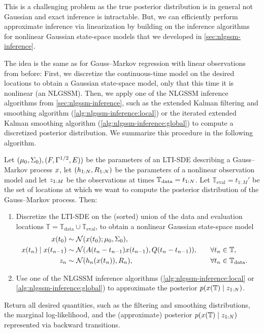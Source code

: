 \documentclass{mimosis}
\begin{document}
This is a challenging problem as the true posterior distribution is in general not Gaussian and exact inference is intractable.
But, we can efficiently perform approximate inference via linearization by building on the inference algorithms for nonlinear Gaussian state-space models that we developed in \cref{sec:nlgssm-inference}.

The idea is the same as for Gauss--Markov regression with linear observations from before:
First, we discretize the continuous-time model on the desired locations to obtain a Gaussian state-space model, only that this time it is nonlinear (an NLGSSM).
Then, we apply one of the NLGSSM inference algorithms from
\cref{sec:nlgssm-inference},
such as the extended Kalman filtering and smoothing algorithm (\ref{alg:nlgssm-inference:local})
or the iterated extended Kalman smoothing algorithm
(\ref{alg:nlgssm-inference:global})
to compute a discretized posterior distribution.
We summarize this procedure in the following algorithm.


\begin{alg}
\algeqspacing
\label{alg:nonlineargaussmarkovregression}
Let
\((\mu_{0}, \Sigma_{0}), (F, \Gamma^{1/2}, E))\)
be the parameters of an LTI-SDE describing a Gauss--Markov process \(x\),
let
\((h_{1:N}, R_{1:N})\)
be the parameters of a nonlinear observation model
and let
\(z_{1:M}\)
be the observations at times \(\mathbb{T}_\text{data} = t_{1:N}\).
Let \(\mathbb{T}_\text{eval} = t_{1:M}'\) be the set of locations at which we want to compute the posterior distribution of the Gauss--Markov process.
Then:
\begin{enumerate}
\item Discretize the LTI-SDE on the (sorted) union of the data and evaluation locations
\(\mathbb{T} = \mathbb{T}_\text{data} \cup \mathbb{T}_\text{eval}\),
to obtain a nonlinear Gaussian state-space model
\begin{subequations}
\begin{align}
\st(t_0) &\sim \N( \st(t_0); \mean{0}, \cov{0} ), \\
\st(t_\idxt) \mid \st(t_{\idxt-1}) &\sim \N( \transA(t_\idxt-t_{\idxt-1}) \st(t_{\idxt-1}), \transC(t_\idxt-t_{\idxt-1}) ), \quad && \forall t_\idxt \in \mathbb{T}, \\
\obs_\idxt &\sim \N( \obsh_\idxt(\st(t_\idxt)), \obsC_\idxt ), \quad && \forall t_\idxt \in \mathbb{T}_\text{data}.
\end{align}
\end{subequations}
\item Use one of the NLGSSM inference algorithms
(\ref{alg:nlgssm-inference:local} or \ref{alg:nlgssm-inference:global})
to approximate the posterior \(\p(\st(\mathbb{T}) \mid \sobs_{1:N})\).
\end{enumerate}

Return all desired quantities, such as the
filtering and smoothing distributions,
the marginal log-likelihood,
and the (approximate) posterior \(\p(\st(\mathbb{T}) \mid \sobs_{1:N})\) represented via backward transitions.
\end{alg}
\end{document}
